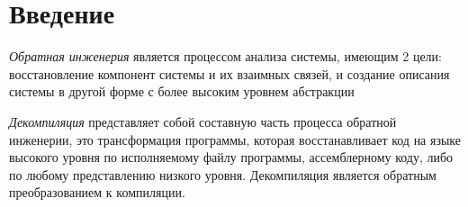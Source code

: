 \documentclass[a4paper,12pt,russian]{article}
\begin{document}

\tableofcontents

\newpage

\section*{Введение}
\emph{Обратная инженерия} является процессом анализа системы, имеющим 2 цели: восстановление компонент системы и их взаимных связей, и создание описания системы в другой форме с более высоким уровнем абстракции

\emph{Декомпиляция} представляет собой составную часть процесса обратной инженерии, это трансформация программы, которая восстанавливает код на языке высокого уровня по исполняемому файлу программы, ассемблерному коду, либо по любому представлению низкого уровня.
Декомпиляция является обратным преобразованием к компиляции.
\end{document}
